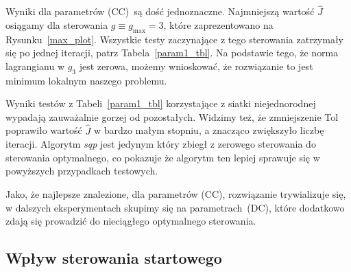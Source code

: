 \documentclass[licencjacka]{pracamgr}
\begin{document}
Wyniki dla parametrów (CC)\ są dość jednoznaczne. Najmniejszą wartość $\hat{J}$ osiągamy dla sterowania $g \equiv g_{\max} = 3$, które zaprezentowano na Rysunku~\ref{max_plot}. Wszystkie testy zaczynające z tego sterowania zatrzymały się po jednej iteracji, patrz Tabela~\ref{param1_tbl}. Na podstawie tego, że norma lagrangianu w $g_3$ jest zerowa, możemy wnioskować, że rozwiązanie to jest minimum lokalnym naszego problemu.

Wyniki testów z Tabeli~\ref{param1_tbl} korzystające z siatki niejednorodnej wypadają zauważalnie gorzej od pozostałych. Widzimy też, że zmniejszenie Tol poprawiło wartość $\hat{J}$ w bardzo małym stopniu, a znacząco zwiększyło liczbę iteracji. Algorytm {\it sqp\/} jest jedynym który zbiegł z zerowego sterowania do sterowania optymalnego, co pokazuje że algorytm ten lepiej sprawuje się w powyższych przypadkach testowych.

Jako, że najlepsze znalezione, dla parametrów (CC), rozwiązanie trywializuje się, w dalszych eksperymentach skupimy się na parametrach~(DC), które dodatkowo zdają się prowadzić do nieciągłego optymalnego sterowania.

\subsection{Wpływ sterowania startowego}
\end{document}
